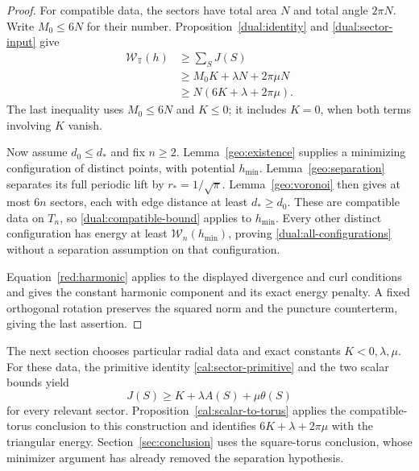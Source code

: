 \begin{proof}
For compatible data, the sectors have total area \(N\) and total
angle \(2\pi N\). Write \(M_0\leq6N\) for their number.
Proposition~\ref{dual:identity} and \eqref{dual:sector-input} give
\[
 \begin{aligned}
 \mathcal W_{\mathbb T}(h)
 &\geq\sum_S J(S)\\
 &\geq M_0K+\lambda N+2\pi\mu N\\
 &\geq N(6K+\lambda+2\pi\mu).
 \end{aligned}
\]
The last inequality uses \(M_0\leq6N\) and \(K\leq0\); it includes
\(K=0\), when both terms involving \(K\) vanish.

Now assume \(d_0\leq d_*\) and fix \(n\geq2\).
Lemma~\ref{geo:existence} supplies a minimizing configuration of
distinct points, with potential \(h_{\min}\).
Lemma~\ref{geo:separation} separates its full periodic lift by
\(r_*=1/\sqrt\pi\). Lemma~\ref{geo:voronoi} then gives at most
\(6n\) sectors, each with edge distance at least \(d_*\geq d_0\).
These are compatible data on \(T_n\), so
\eqref{dual:compatible-bound} applies to \(h_{\min}\).
Every other distinct configuration has energy at least
\(\mathcal W_n(h_{\min})\), proving
\eqref{dual:all-configurations} without a separation assumption on
that configuration.

Equation~\eqref{red:harmonic} applies to the displayed divergence and
curl conditions and gives the constant harmonic component and its
exact energy penalty. A fixed orthogonal rotation preserves the
squared norm and the puncture counterterm, giving the last assertion.
\end{proof}

The next section chooses particular radial data and exact constants
\(K<0,\lambda,\mu\). For these data, the primitive identity
\eqref{cal:sector-primitive} and the two scalar bounds yield
\[
 J(S)\geq K+\lambda A(S)+\mu\theta(S)
\]
for every relevant sector. Proposition~\ref{cal:scalar-to-torus}
applies the compatible-torus conclusion to this construction and
identifies \(6K+\lambda+2\pi\mu\) with the triangular energy.
Section~\ref{sec:conclusion} uses the square-torus conclusion, whose
minimizer argument has already removed the separation hypothesis.
